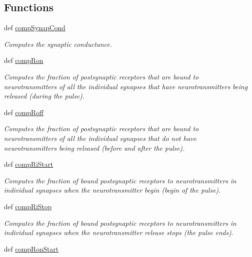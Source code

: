 \subsection*{Functions}
\begin{DoxyCompactItemize}
\item 
def \hyperlink{namespace_synapse_a55ffd471fbed3550b464a9862687f541}{comp\-Synap\-Cond}
\begin{DoxyCompactList}\small\item\em Computes the synaptic conductance. \end{DoxyCompactList}\item 
def \hyperlink{namespace_synapse_a16fdc8aab9a394041c8b6667511a1fd7}{comp\-Ron}
\begin{DoxyCompactList}\small\item\em Computes the fraction of postsynaptic receptors that are bound to neurotransmitters of all the individual synapses that have neurotransmitters being released (during the pulse). \end{DoxyCompactList}\item 
def \hyperlink{namespace_synapse_aadfeb939e02125a55a2b2acc6634ba41}{comp\-Roff}
\begin{DoxyCompactList}\small\item\em Computes the fraction of postsynaptic receptors that are bound to neurotransmitters of all the individual synapses that do not have neurotransmitters being released (before and after the pulse). \end{DoxyCompactList}\item 
def \hyperlink{namespace_synapse_a6d5943c0d974d992b8c9daa3ff3818d6}{comp\-Ri\-Start}
\begin{DoxyCompactList}\small\item\em Computes the fraction of bound postsynaptic receptors to neurotransmitters in individual synapses when the neurotransmitter begin (begin of the pulse). \end{DoxyCompactList}\item 
def \hyperlink{namespace_synapse_a67ee3bb7abbf9608bd83c31c63634cac}{comp\-Ri\-Stop}
\begin{DoxyCompactList}\small\item\em Computes the fraction of bound postsynaptic receptors to neurotransmitters in individual synapses when the neurotransmitter release stops (the pulse ends). \end{DoxyCompactList}\item 
def \hyperlink{namespace_synapse_a3bbc4948087cc789af35085ea0423a93}{comp\-Ron\-Start}

\end{DoxyCompactItemize}
